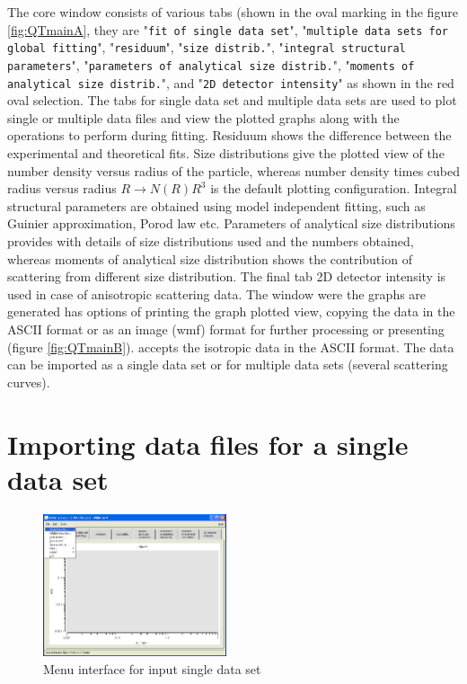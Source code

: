 \sloppy
The core \SASfit window consists of various tabs (shown in the oval
marking in the figure \ref{fig:QTmainA}, they are "\texttt{fit of single data set}",
"\texttt{multiple data sets for global fitting}", "\texttt{residuum}", "\texttt{size
distrib.}", "\texttt{integral structural parameters}", "\texttt{parameters of
analytical size distrib.}", "\texttt{moments of analytical size
distrib.}", and "\texttt{2D detector intensity}" as shown in the red oval
selection. The tabs for single data set and multiple data sets are used to
plot single or multiple data files and view the plotted graphs along
with the operations to perform during fitting. Residuum shows the
difference between the experimental and theoretical fits. Size
distributions give the plotted view of the number density versus radius
of the particle, whereas number density times cubed radius versus radius $R\rightarrow N(R)R^3$ is the default plotting configuration. Integral structural parameters are obtained using model independent fitting, such as Guinier approximation, Porod law etc. Parameters of analytical size distributions provides with details of size distributions used and the numbers obtained, whereas
moments of analytical size distribution shows the contribution of
scattering from different size distribution. The final tab 2D
detector intensity is used in case of anisotropic scattering data.
The window were the graphs are generated has options of printing the
graph plotted view, copying the data in the ASCII format or as an
image (wmf) format for further processing or presenting (figure
\ref{fig:QTmainB}). \SASfit accepts the isotropic data in the ASCII
format. The data can be imported as a single data set or for
multiple data sets (several scattering curves).

\section{Importing data files for a single data set}
\begin{figure}[htb]
\includegraphics[width=0.48\textwidth]{QTloadingSingleDS.png}
\caption{Menu interface for input single data set}
\label{fig:QTloadingSingleDS}
\end{figure}

